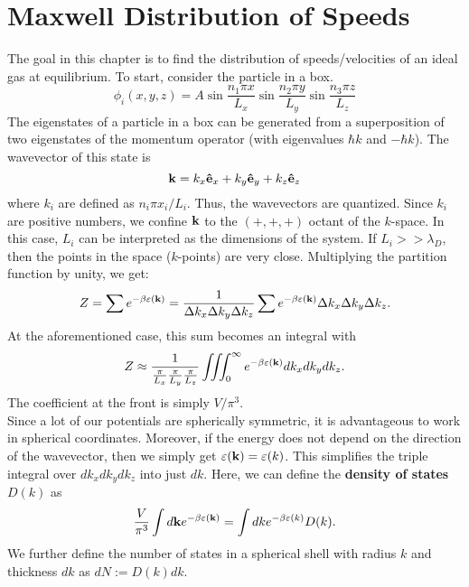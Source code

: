 \chapter{Maxwell Distribution of Speeds}
The goal in this chapter is to find the distribution of speeds/velocities of an ideal gas at equilibrium. To start, consider the particle in a box.
\begin{equation}
    \phi_i(x,y,z) = A\sin\frac{n_1\pi x}{L_x}\sin\frac{n_2\pi y}{L_y}\sin\frac{n_3\pi z}{L_z}
\end{equation}
The eigenstates of a particle in a box can be generated from a superposition of two eigenstates of the momentum operator (with eigenvalues $\hbar k$ and $-\hbar k$). The wavevector of this state is 
\begin{equation}
    \mathbf{k} = k_x\mathbf{\hat{e}}_{x}+k_y\mathbf{\hat{e}}_{y}+k_z\mathbf{\hat{e}}_{z}
\end{equation}
where $k_i$ are defined as $n_i\pi x_i/L_i$. Thus, the wavevectors are quantized. Since $k_i$ are positive numbers, we confine $\mathbf{k}$ to the $(+,+,+)$ octant of the $k$-space. In this case, $L_i$ can be interpreted as the dimensions of the system. If $L_i >> \lambda_D$, then the points in the space ($k$-points) are very close. Multiplying the partition function by unity, we get:
\begin{equation}
    Z=\sum e^{-\beta\varepsilon(\mathbf{k})}=\frac{1}{\Delta k_x\Delta k_y\Delta k_z}\sum e^{-\beta\varepsilon(\mathbf{k})}\Delta k_x\Delta k_y\Delta k_z. 
\end{equation}
At the aforementioned case, this sum becomes an integral with
\begin{equation}
    Z \approx \frac{1}{\frac{\pi}{L_x}\frac{\pi}{L_y}\frac{\pi}{L_z}}\iiint_0^\infty e^{-\beta\varepsilon(\mathbf{k})}dk_xdk_ydk_z.
\end{equation}
The coefficient at the front is simply $V/\pi^3$. \\
Since a lot of our potentials are spherically symmetric, it is advantageous to work in spherical coordinates. Moreover, if the energy does not depend on the direction of the wavevector, then we simply get $\varepsilon(\mathbf{k})=\varepsilon(k)$. This simplifies the triple integral over $dk_xdk_ydk_z$ into just $dk$. Here, we can define the \textbf{density of states} $D(k)$ as
\begin{equation}
    \frac{V}{\pi^3}\int d\mathbf{k}e^{-\beta\varepsilon(\mathbf{k})}=\int dk e^{-\beta\varepsilon(k)}D(k).
\end{equation}
We further define the number of states in a spherical shell with radius $k$ and thickness $dk$ as $dN := D(k)dk$. \\ 
